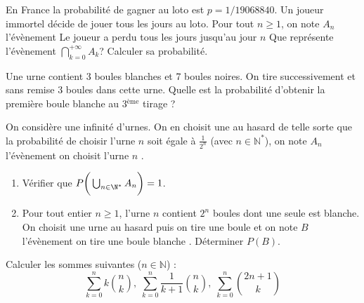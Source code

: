 \documentclass[twoside,a4paper,french,10pt]{VcCours}
\begin{document}
     


\begin{Exercice} 
  En France la probabilité de gagner au loto est $p=1/19 068 840$. 
  Un joueur immortel décide de jouer tous les jours au loto. 
  Pour tout $n \geq 1$, on note $A_n$ l'évènement
  \og Le joueur a perdu tous les jours jusqu'au jour $n$ \fg
  Que représente l'évènement $\bigcap_{k=0}^{+\infty}A_k$? Calculer sa probabilité.
\end{Exercice} 

\begin{Exercice} 
  Une urne contient 3 boules blanches et 7 boules noires. On tire successivement et sans remise 3 boules dans cette urne. Quelle est la probabilité d'obtenir la première boule blanche au 3$^{\text{ème}}$ tirage ?
\end{Exercice}   

\begin{Exercice} 
  On considère une infinité d'urnes. On en choisit une au hasard de telle sorte que la probabilité de choisir l'urne $n$ soit égale à $\frac{1}{2^n}$ (avec $n \in \mathbb{N}^*$), on note $A_n$ l'évènement \og on choisit l'urne $n$ \fg .
  \begin{enumerate}
    \item Vérifier que $P \bigg{(} \bigcup_{n \in \N^*} A_n \bigg{)} = 1$.
    \item Pour tout entier $n \geq 1$, l'urne $n$ contient $2^n$ boules dont une seule est blanche. On choisit une urne au hasard puis on tire une boule et on note $B$ l'évènement \og on tire une boule blanche \fg . Déterminer $P(B)$. 
  \end{enumerate}
\end{Exercice} 

\begin{Exercice}
  Calculer les sommes suivantes ($n \in \mathbb{N}$) : 
  $$\sum_{k=0}^n k \binom{n}{k}, \; \sum_{k=0}^n\frac{1}{k+1} \binom{n}{k}, \; \sum_{k=0}^n \binom{2n+1}{k}$$
\end{Exercice}   
    
\end{document}
